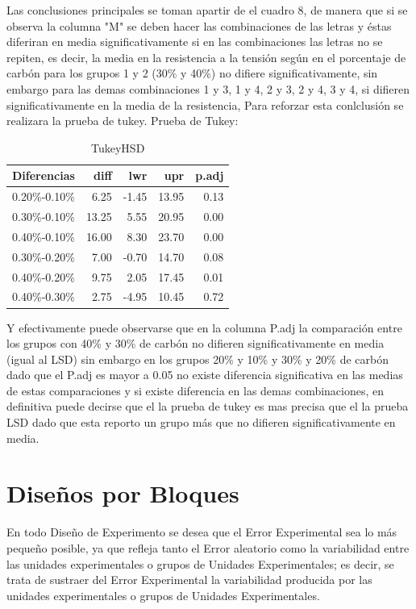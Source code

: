 \documentclass[12pt,letterpaper]{report}
\begin{document}
Las conclusiones principales se toman apartir de el cuadro 8, de manera que si se observa la columna "M" se deben hacer las combinaciones de las letras y éstas diferiran en media significativamente si en las combinaciones las letras no se repiten, es decir, la media en la resistencia a la tensión según en el porcentaje de carbón para los grupos 1 y 2 (30\% y 40\%) no difiere significativamente, sin embargo para las demas combinaciones 1 y 3, 1 y 4, 2 y 3, 2 y 4, 3 y 4, si difieren significativamente en la media de la resistencia, Para reforzar esta conlclusión se realizara la prueba de tukey.
\newpage
Prueba de Tukey: 
\begin{Schunk}
\end{Schunk}

\begin{table}[ht]
\centering
\begin{tabular}{rrrrr}
  \hline
 Diferencias  & diff & lwr & upr & p.adj \\ 
  \hline
0.20\%-0.10\% & 6.25 & -1.45 & 13.95 & 0.13 \\ 
  0.30\%-0.10\% & 13.25 & 5.55 & 20.95 & 0.00 \\ 
  0.40\%-0.10\% & 16.00 & 8.30 & 23.70 & 0.00 \\ 
  0.30\%-0.20\% & 7.00 & -0.70 & 14.70 & 0.08 \\ 
  0.40\%-0.20\% & 9.75 & 2.05 & 17.45 & 0.01 \\ 
  0.40\%-0.30\% & 2.75 & -4.95 & 10.45 & 0.72 \\ 
   \hline
\end{tabular}
\caption{TukeyHSD}
\end{table}

Y efectivamente puede observarse que en la columna P.adj la comparación entre los grupos con 40\% y 30\% de carbón no difieren significativamente en media (igual al LSD) sin embargo en los grupos 20\% y 10\% y 30\% y 20\% de carbón  dado que el P.adj es mayor a 0.05 no existe diferencia significativa en las medias de estas comparaciones y si existe diferencia en las demas combinaciones, en definitiva puede decirse que el la prueba de tukey es mas precisa que el la prueba LSD dado que esta reporto un grupo más que no difieren significativamente en media.
\newpage
\chapter*{Diseños por Bloques}
En todo Diseño de Experimento se desea que el Error Experimental sea lo más pequeño
posible, ya que refleja tanto el Error aleatorio como la variabilidad entre las unidades
experimentales o grupos de Unidades Experimentales; es decir, se trata de sustraer del Error
Experimental la variabilidad producida por las unidades experimentales o grupos de Unidades
Experimentales.
\end{document}

